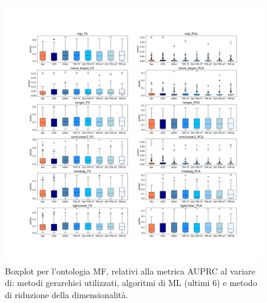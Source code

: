 \documentclass[12pt]{report}
\begin{document}
\begin{appendices}
\begin{figure}[h]
 \hspace*{-2.6cm}
\includegraphics[scale=0.34]{./images/MF_PRC_2.png}
\caption{\footnotesize{Boxplot per l'ontologia MF, relativi alla metrica AUPRC al variare di: metodi gerarchici utilizzati, algoritmi di ML (ultimi 6) e metodo di riduzione della dimensionalità.}}
\label{MF_PRC_2}
\end{figure}


\end{appendices}
\end{document}
